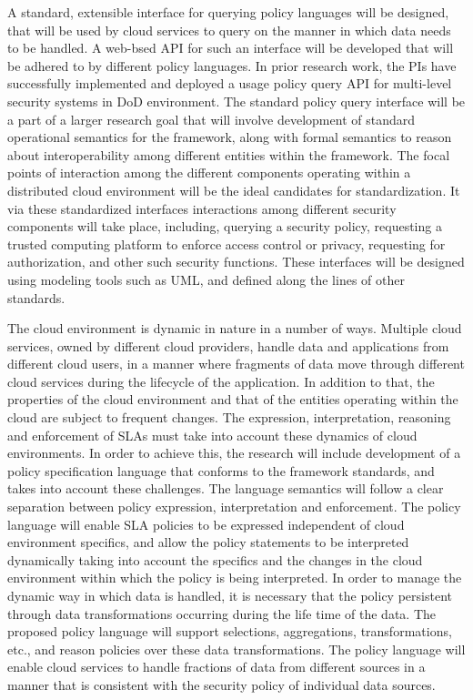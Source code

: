 \documentclass[10pt, conference, compsoc]{IEEEtran}
\begin{document}
A standard, extensible interface for querying policy languages will be designed, that will be used by cloud services to query on the manner in which data needs to be handled. A web-bsed API for such an interface will be developed that will be adhered to by different policy languages. In prior research work, the PIs have successfully implemented and deployed a usage policy query API for multi-level security systems in DoD environment. The standard policy query interface will be a part of a larger research goal that will involve development of standard operational semantics for the framework, along with formal semantics to reason about interoperability among different entities within the framework. The focal points of interaction among the different components operating within a distributed cloud environment will be the ideal candidates for standardization. It via these standardized interfaces interactions among different security components will take place, including, querying a security policy, requesting a trusted computing platform to enforce access control or privacy, requesting for authorization, and other such security functions. These interfaces will be designed using modeling tools such as UML, and defined along the lines of other standards. 

The cloud environment is dynamic in nature in a number of ways. Multiple cloud services, owned by different cloud providers, handle data and applications from different cloud users, in a manner where fragments of data move through different cloud services during the lifecycle of the application. In addition to that, the properties of the cloud environment and that of the entities operating within the cloud are subject to frequent changes. The expression, interpretation, reasoning and enforcement of SLAs must take into account these dynamics of cloud environments.  In order to achieve this, the research will include development of a policy specification language that conforms to the framework standards, and takes into account these challenges. The language semantics will follow a clear separation between policy expression, interpretation and enforcement. The policy language will enable SLA policies to be expressed independent of cloud environment specifics, and allow the policy statements to be interpreted dynamically taking into account the specifics and the changes in the cloud environment within which the policy is being interpreted.  In order to manage the dynamic way in which data is handled, it is necessary that the policy persistent through data transformations occurring during the life time of the data. The proposed policy language will support selections, aggregations, transformations, etc., and reason policies over these data transformations. The policy language will enable cloud services to handle fractions of data from different sources in a manner that is consistent with the security policy of individual data sources. 
\end{document}
